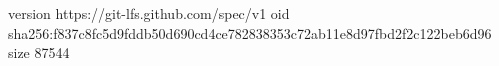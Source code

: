 version https://git-lfs.github.com/spec/v1
oid sha256:f837c8fc5d9fddb50d690cd4ce782838353c72ab11e8d97fbd2f2c122beb6d96
size 87544
